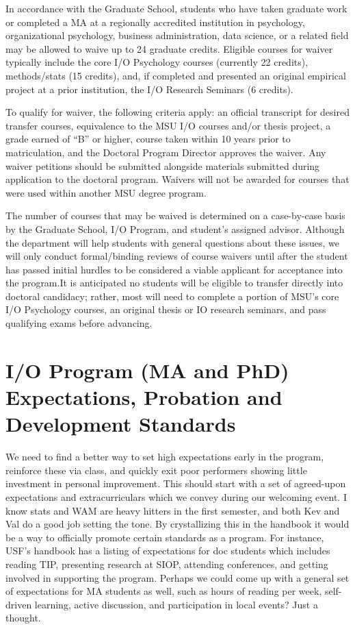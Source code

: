 \documentclass[
]{book}
\begin{document}
In accordance with the Graduate School, students who have taken graduate work or completed a MA at a regionally accredited institution in psychology, organizational psychology, business administration, data science, or a related field may be allowed to waive up to 24 graduate credits. Eligible courses for waiver typically include the core I/O Psychology courses (currently 22 credits), methods/stats (15 credits), and, if completed and presented an original empirical project at a prior institution, the I/O Research Seminars (6 credits).

To qualify for waiver, the following criteria apply: an official transcript for desired transfer courses, equivalence to the MSU I/O courses and/or thesis project, a grade earned of ``B'' or higher, course taken within 10 years prior to matriculation, and the Doctoral Program Director approves the waiver. Any waiver petitions should be submitted alongside materials submitted during application to the doctoral program. Waivers will not be awarded for courses that were used within another MSU degree program.

The number of courses that may be waived is determined on a case-by-case basis by the Graduate School, I/O Program, and student's assigned advisor. Although the department will help students with general questions about these issues, we will only conduct formal/binding reviews of course waivers until after the student has passed initial hurdles to be considered a viable applicant for acceptance into the program.It is anticipated no students will be eligible to transfer directly into doctoral candidacy; rather, most will need to complete a portion of MSU's core I/O Psychology courses, an original thesis or IO research seminars, and pass qualifying exams before advancing.

\hypertarget{develop}{%
\chapter{I/O Program (MA and PhD) Expectations, Probation and Development Standards}\label{develop}}

We need to find a better way to set high expectations early in the program, reinforce these via class, and quickly exit poor performers showing little investment in personal improvement. This should start with a set of agreed-upon expectations and extracurriculars which we convey during our welcoming event. I know stats and WAM are heavy hitters in the first semester, and both Kev and Val do a good job setting the tone. By crystallizing this in the handbook it would be a way to officially promote certain standards as a program. For instance, USF's handbook has a listing of expectations for doc students which includes reading TIP, presenting research at SIOP, attending conferences, and getting involved in supporting the program. Perhaps we could come up with a general set of expectations for MA students as well, such as hours of reading per week, self-driven learning, active discussion, and participation in local events? Just a thought.
\end{document}
